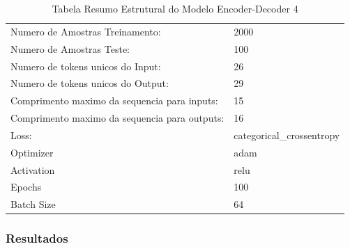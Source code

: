 \begin{table}[H]
\centering
\begin{tabular}{ll}
Numero de Amostras Treinamento: & 2000 \\
Numero de Amostras Teste: & 100 \\
Numero de tokens unicos do Input: & 26 \\
Numero de tokens unicos do Output: & 29 \\
Comprimento maximo da sequencia para inputs: & 15 \\
Comprimento maximo da sequencia para outputs: & 16 \\
Loss: & categorical\_crossentropy \\
Optimizer & adam \\
Activation & relu \\
Epochs & 100 \\
Batch Size & 64
\end{tabular}
\caption{Tabela Resumo Estrutural do Modelo Encoder-Decoder 4}
\label{tab:resumo4}
\end{table}

\subsubsection{Resultados}

